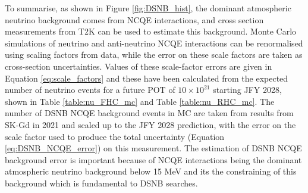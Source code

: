 To summarise, as shown in Figure \ref{fig:DSNB_hist}, the dominant atmospheric neutrino background comes from NCQE interactions, and cross section measurements from T2K can be used to estimate this background. Monte Carlo simulations of neutrino and anti-neutrino NCQE interactions can be renormalised using scaling factors from data, while the error on these scale factors are taken as cross-section uncertainties. Values of these scale-factor errors are given in Equation \ref{eq:scale_factors} and these have been calculated from the expected number of neutrino events for a future POT of $10 \times 10^{21}$ starting JFY 2028, shown in Table \ref{table:nu_FHC_mc} and Table \ref{table:nu_RHC_mc}. The number of DSNB NCQE background events in MC are taken from results from SK-Gd in 2021 and scaled up to the JFY 2028 prediction, with the error on the scale factor used to produce the total uncertainty (Equation \ref{eq:DSNB_NCQE_error}) on this measurement. The estimation of DSNB NCQE background error is important because of NCQE interactions being the dominant atmospheric neutrino background below 15 MeV and its the constraining of this background which is fundamental to DSNB searches. 

